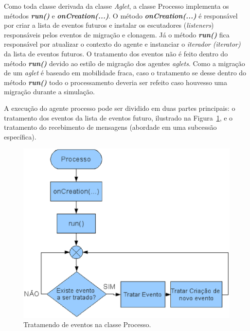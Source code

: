 Como toda classe derivada da classe \textit{Aglet}, a classe Processo implementa os métodos \textit{\textbf{run()}} e \textit{\textbf{onCreation(...)}}. O método \textit{\textbf{onCreation(...)}} é responsável por criar a lista de eventos futuros e instalar os escutadores (\textit{listeners}) responsáveis pelos eventos de migração e clonagem. Já o método \textit{\textbf{run()}} fica responsável por atualizar o contexto do agente e instanciar o \textit{iterador (iterator)} da lista de eventos futuros. O tratamento dos eventos não é
feito dentro do método \textit{\textbf{run()}} devido ao estilo de migração dos agentes \textit{aglets}. Como a migração de um \textit{aglet} é baseado em mobilidade fraca, caso o tratamento se desse dentro do método \textit{\textbf{run()}} todo o processamento deveria ser refeito caso houvesso uma migração durante a simulação.

A execução do agente processo pode ser dividido em duas partes principais: o tratamento dos eventos da lista de eventos futuro, ilustrado na Figura~\ref{fig:diagrama_tratamento}, e o tratamento do recebimento de mensagens (abordade em uma subcessão específica).

\begin{figure}[htb]
  \centering
  \centerline{\includegraphics[scale=0.6]{imagens/diagrama_tratamento.eps}}
  \caption{ Tratamendo de eventos na classe Processo.}
\label{fig:diagrama_tratamento}
\end{figure}

